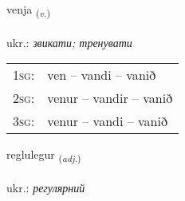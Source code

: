 \documentclass[frontgrid, backgrid]{flacards}\usepackage[]{graphicx}\usepackage[]{xcolor}
\begin{document}
\renewcommand{\flhead}{\vskip5pt \fboxsep=0pt {\small\bfseries\footnotesize Sagnorð | дієслово}}
\renewcommand{\fcfoot}{\vskip5pt \fboxsep=0pt \hspace{2pt}{\small\bfseries\footnotesize 3K}}

\renewcommand{\blhead}{\vskip5pt {\small\bfseries\footnotesize Sagnorð | дієслово }}
\renewcommand{\bcfoot}{\vskip5pt \hspace{2pt}{\small\bfseries\footnotesize 3K}}


{venja \small{\textsubscript{(\textit{v.})}} \\[1ex] %
\textphonetic{[vɛnja]} \\
ukr.: \emph{звикати; тренувати} \\  [2ex]
\renewcommand*{\arraystretch}{0.8}
\begin{tabular}{p{1cm}l}
\textsc{1sg}: & ven -- vandi -- vanið \\ 
\textsc{2sg}: & venur -- vandir -- vanið \\ 
\textsc{3sg}: & venur -- vandi -- vanið \\ 
\end{tabular}
}

\renewcommand{\flhead}{\vskip5pt \fboxsep=0pt {\small\bfseries\footnotesize Lýsingarorð | прикметник}}
\renewcommand{\fcfoot}{\vskip5pt \fboxsep=0pt \hspace{2pt}{\small\bfseries\footnotesize 3K}}

\renewcommand{\blhead}{\vskip5pt {\small\bfseries\footnotesize Lýsingarorð | прикметник }}
\renewcommand{\bcfoot}{\vskip5pt \hspace{2pt}{\small\bfseries\footnotesize 3K}}


{reglulegur \small{\textsubscript{(\textit{adj.})}} \\[1ex] %
\textphonetic{[rɛklʏlɛɣʏr]} \\
ukr.: \emph{регулярний} \\  [2ex]
\renewcommand*{\arraystretch}{0.8}
}
\end{document}
